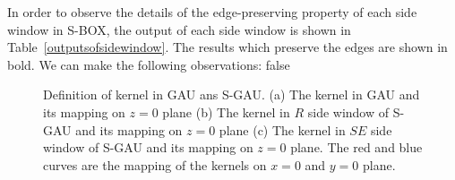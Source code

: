\documentclass[10pt,twocolumn,letterpaper]{article}
\begin{document}
In order to observe the details of the edge-preserving property of each side window in S-BOX, the output of each side window is shown in Table~\ref{outputsofsidewindow}. The results which preserve the edges are shown in bold. We can make the following observations: \if false
\begin{figure}[h]
	\centering
	\caption{Definition of kernel in GAU ans S-GAU. (a) The kernel in GAU and its mapping on $z=0$ plane (b) The kernel in $R$ side window of S-GAU and its mapping on $z=0$ plane (c) The kernel in $SE$ side window of S-GAU and its mapping on $z=0$ plane. The red and blue curves are the mapping of the kernels on $x=0$ and $y=0$ plane.}
	\label{sgau}
\end{figure}
\fi
\end{document}
